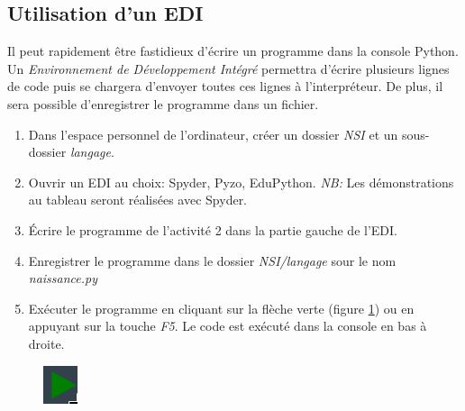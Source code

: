 \documentclass[a4paper,11pt]{article}
\begin{document}
\begin{Form}
\subsection{Utilisation d'un EDI}
Il peut rapidement être fastidieux d'écrire un programme dans la console Python. Un \emph{Environnement de Développement Intégré} permettra d'écrire plusieurs lignes de code puis se chargera d'envoyer toutes ces lignes à l'interpréteur. De plus, il sera possible d'enregistrer le programme dans un fichier.
\begin{activite}
\begin{enumerate}
\item Dans l'espace personnel de l'ordinateur, créer un dossier \emph{NSI} et un sous-dossier \emph{langage}.
\item Ouvrir un EDI au choix: Spyder, Pyzo, EduPython. \emph{NB:} Les démonstrations au tableau seront réalisées avec Spyder.
\item Écrire le programme de l'activité 2 dans la partie gauche de l'EDI.
\item Enregistrer le programme dans le dossier \emph{NSI/langage} sour le nom \emph{naissance.py}
\item Exécuter le programme en cliquant sur la flèche verte (figure \ref{execution}) ou en appuyant sur la touche \emph{F5}. Le code est exécuté dans la console en bas à droite.
\end{enumerate}
\end{activite}
\begin{figure}[!h]
\centering
\includegraphics[width=1cm]{ressources/execution.png}
\label{execution}
\end{figure}

\end{Form}
\end{document}
